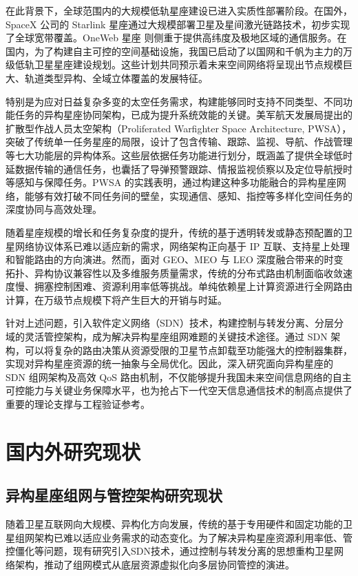 \documentclass[print, master, vlined]{DissertUESTC}
\begin{document}
    在此背景下，全球范围内的大规模低轨星座建设已进入实质性部署阶段。在国外，SpaceX 公司的 Starlink 星座通过大规模部署卫星及星间激光链路技术，初步实现了全球宽带覆盖。OneWeb 星座 则侧重于提供高纬度及极地区域的通信服务。在国内，为了构建自主可控的空间基础设施，我国已启动了以国网和千帆为主力的万级低轨卫星星座建设规划。这些计划共同预示着未来空间网络将呈现出节点规模巨大、轨道类型异构、全域立体覆盖的发展特征。
    
    特别是为应对日益复杂多变的太空任务需求，构建能够同时支持不同类型、不同功能任务的异构星座协同架构，已成为提升系统效能的关键。美军航天发展局提出的扩散型作战人员太空架构（Proliferated Warfighter Space Architecture, PWSA），突破了传统单一任务星座的局限，设计了包含传输、跟踪、监视、导航、作战管理等七大功能层的异构体系。这些层依据任务功能进行划分，既涵盖了提供全球低时延数据传输的通信任务，也囊括了导弹预警跟踪、情报监视侦察以及定位导航授时等感知与保障任务。PWSA 的实践表明，通过构建这种多功能融合的异构星座网络，能够有效打破不同任务间的壁垒，实现通信、感知、指控等多样化空间任务的深度协同与高效处理。
    
    随着星座规模的增长和任务复杂度的提升，传统的基于透明转发或静态预配置的卫星网络协议体系已难以适应新的需求，网络架构正向基于 IP 互联、支持星上处理和智能路由的方向演进。然而，面对 GEO、MEO 与 LEO 深度融合带来的时变拓扑、异构协议兼容性以及多维服务质量需求，传统的分布式路由机制面临收敛速度慢、拥塞控制困难、资源利用率低等挑战。单纯依赖星上计算资源进行全网路由计算，在万级节点规模下将产生巨大的开销与时延。
    
    针对上述问题，引入软件定义网络（SDN）技术，构建控制与转发分离、分层分域的灵活管控架构，成为解决异构星座组网难题的关键技术途径。通过 SDN 架构，可以将复杂的路由决策从资源受限的卫星节点卸载至功能强大的控制器集群，实现对异构星座资源的统一抽象与全局优化。因此，深入研究面向异构星座的 SDN 组网架构及高效 QoS 路由机制，不仅能够提升我国未来空间信息网络的自主可控能力与关键业务保障水平，也为抢占下一代空天信息通信技术的制高点提供了重要的理论支撑与工程验证参考。
    

    \section{国内外研究现状}
    \subsection{异构星座组网与管控架构研究现状}
    随着卫星互联网向大规模、异构化方向发展，传统的基于专用硬件和固定功能的卫星组网架构已难以适应业务需求的动态变化。为了解决异构星座资源利用率低、管控僵化等问题，现有研究引入SDN技术，通过控制与转发分离的思想重构卫星网络架构，推动了组网模式从底层资源虚拟化向多层协同管控的演进。
\end{document}
